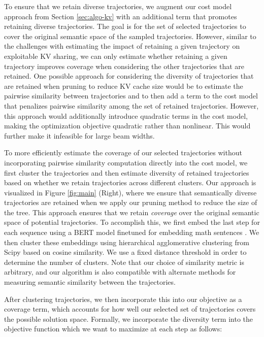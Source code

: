To ensure that we retain diverse trajectories, we augment our cost model approach from Section \ref{sec:algo-kv} with an additional term that promotes retaining diverse trajectories.
The goal is for the set of selected trajectories to cover the original semantic space of the sampled trajectories.
However, similar to the challenges with estimating the impact of retaining a given trajectory on exploitable KV sharing, we can only estimate whether retaining a given trajectory improves coverage when considering the other trajectories that are retained.
One possible approach for considering the diversity of trajectories that are retained when pruning to reduce KV cache size would be to estimate the pairwise similarity between trajectories and to then add a term to the cost model that penalizes pairwise similarity among the set of retained trajectories. 
However, this approach would additionally introduce quadratic terms in the cost model, making the optimization objective quadratic rather than nonlinear.
This would further make it infeasible for large beam widths.

To more efficiently estimate the coverage of our selected trajectories without incorporating pairwise similarity computation directly into the cost model, we first cluster the trajectories and then estimate diversity of retained trajectories based on whether we retain trajectories across different clusters. 
Our approach is visualized in Figure \ref{fig:main} (Right), where we ensure that semantically diverse trajectories are retained when we apply our pruning method to reduce the size of the tree.
This approach ensures that we retain \textit{coverage} over the original semantic space of potential trajectories.
To accomplish this, we first embed the last step for each sequence using a BERT model finetuned for embedding math sentences \cite{steinfeldt2024evaluation}.
We then cluster these embeddings using  hierarchical agglomerative clustering from Scipy \cite{virtanen2020scipy} based on cosine similarity.
We use a fixed distance threshold in order to determine the number of clusters.
Note that our choice of similarity metric is arbitrary, and our algorithm is also compatible with alternate methods for measuring semantic similarity between the trajectories.

After clustering trajectories, we then incorporate this into our objective as a coverage term, which accounts for how well our selected set of trajectories covers the possible solution space.
Formally, we incorporate the diversity term into the objective function which we want to maximize at each step as follows:

